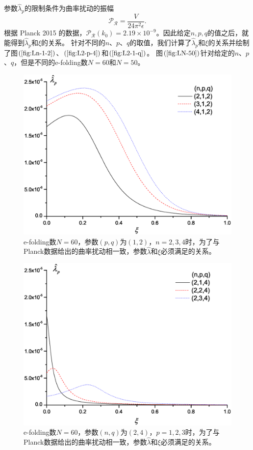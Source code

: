 参数$\hat{\lambda}_{p}$的限制条件为曲率扰动的振幅
\begin{equation}
  \label{eq:amplitude-of-curvature-perturbation-by-Planck}
  \mathcal{P}_{\mathcal{R}} = \frac{V}{24\pi^2\epsilon}.
\end{equation}
根据 Planck 2015 的数据，$\mathcal{P}_{\mathcal{R}}(k_0)=2.19\times
10^{-9}$。因此给定$n,p,q$的值之后，就能得到$\hat{\lambda}_{p}$和$\xi$的关系。
针对不同的$n$、$p$、$q$的取值，我们计算了$\hat{\lambda}_{p}$和$\xi$的关系并绘制了图$(\ref{fig:Ln-1-2})$、$(\ref{fig:L2-p-4})$和$(\ref{fig:L2-1-q})$。
图$(\ref{fig:LN-50})$针对给定的$n$、$p$、$q$，但是不同的e-folding数$N=60$和$N=50$。

\begin{figure}
  \centering
  \includegraphics[width=5in]{Img/Ln,1,2.eps}
  \caption{e-folding数$N=60$，参数$(p,q)$为$(1,
  2)$，$n=2,3,4$时，为了与Planck数据给出的曲率扰动相一致，参数$\hat{\lambda}$和$\xi$必须满足的关系。}\label{fig:Ln-1-2}
\end{figure}

\begin{figure}\small
  \centering
  \includegraphics[width=5in]{Img/L2,p,4.eps}
  \caption{e-folding数$N=60$，参数$(n,q)$为$(2,
  4)$，$p=1,2,3$时，为了与Planck数据给出的曲率扰动相一致，参数$\hat{\lambda}$和$\xi$必须满足的关系。}\label{fig:L2-p-4}
\end{figure}

